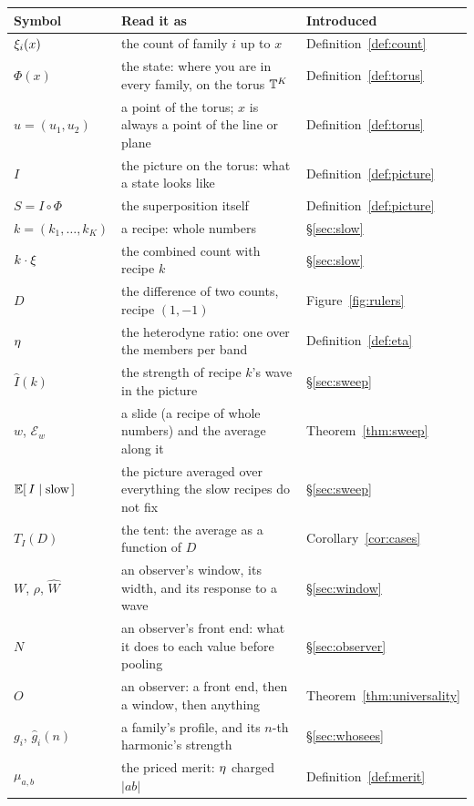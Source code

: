 \begin{table}[t]
  \centering\small
  \begin{tabular}{@{}lll@{}}
    \toprule
    Symbol & Read it as & Introduced \\
    \midrule
    $\xi_i(x)$ & the count of family $i$ up to $x$ & Definition~\ref{def:count} \\
    $\Phi(x)$ & the state: where you are in every family, on the torus $\mathbb{T}^K$ & Definition~\ref{def:torus} \\
    $u=(u_1,u_2)$ & a point of the torus; $x$ is always a point of the line or plane & Definition~\ref{def:torus} \\
    $I$ & the picture on the torus: what a state looks like & Definition~\ref{def:picture} \\
    $S=I\circ\Phi$ & the superposition itself & Definition~\ref{def:picture} \\
    $k=(k_1,\dots,k_K)$ & a recipe: whole numbers & \S\ref{sec:slow} \\
    $k\cdot\xi$ & the combined count with recipe $k$ & \S\ref{sec:slow} \\
    $D$ & the difference of two counts, recipe $(1,-1)$ & Figure~\ref{fig:rulers} \\
    $\eta$ & the heterodyne ratio: one over the members per band & Definition~\ref{def:eta} \\
    $\hat I(k)$ & the strength of recipe $k$'s wave in the picture & \S\ref{sec:sweep} \\
    $w$, $\mathcal E_w$ & a slide (a recipe of whole numbers) and the average along it & Theorem~\ref{thm:sweep} \\
    $\mathbb{E}[\,I\mid\text{slow}\,]$ & the picture averaged over everything the slow recipes do not fix & \S\ref{sec:sweep} \\
    $T_I(D)$ & the tent: the average as a function of $D$ & Corollary~\ref{cor:cases} \\
    $W$, $\rho$, $\widehat W$ & an observer's window, its width, and its response to a wave & \S\ref{sec:window} \\
    $N$ & an observer's front end: what it does to each value before pooling & \S\ref{sec:observer} \\
    $O$ & an observer: a front end, then a window, then anything & Theorem~\ref{thm:universality} \\
    $g_i$, $\hat g_i(n)$ & a family's profile, and its $n$-th harmonic's strength & \S\ref{sec:whosees} \\
    $\mu_{a,b}$ & the priced merit: $\eta$ charged $|ab|$ & Definition~\ref{def:merit} \\

\end{tabular}
\end{table}
